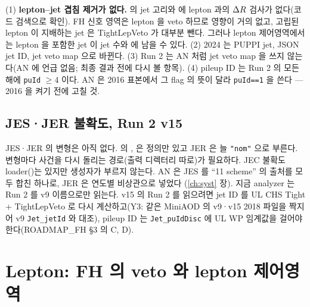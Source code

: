 \begin{andiff}
(1) \textbf{lepton–jet 겹침 제거가 없다.}  의 jet 고리와  에 lepton 과의 $\Delta R$ 검사가 없다(코드 검색으로
확인). FH 신호 영역은 lepton 을 veto 하므로 영향이 거의 없고, 고립된 lepton 이 지배하는 jet 은 TightLepVeto 가 대부분 뺀다. 그러나 lepton
제어영역에서는 lepton 을 포함한 jet 이 jet 수와 \HT{} 에 남을 수 있다\tagours. (2) 2024 는 PUPPI jet, JSON jet ID, jet veto map 으로
바뀐다\tagrunthree. (3) Run 2 는 AN 처럼 jet veto map 을 쓰지 않는다(AN 에 언급 없음; 최종 결과 전에 다시 볼 항목).
(4) pileup ID 는 Run 2 의 모든 해에 \texttt{puId} $\geq 4$ 이다. AN 은 2016 표본에서 그 flag 의 뜻이 달라 \texttt{puId==1} 을 쓴다
 --- 2016 을 켜기 전에 고칠 것.
\end{andiff}

\subsection{JES·JER 불확도, Run 2 v15}\label{sec:objects-jets-syst}

JES·JER 의 변형은 아직 없다.  의 ,  은 정의만 있고 JER 은 늘 \texttt{"nom"} 으로 부른다. 변형마다 사건을 다시
돌리는 경로(출력 디렉터리 따로)가 필요하다\tagplan. JEC 불확도 loader()는 있지만 생성자가
부르지 않는다. AN 은 JES 를 ``11 scheme'' 의 출처를 모두 합친 하나로, JER 은 연도별 비상관으로 넣었다
(\ref{ch:syst} 장). 지금 analyzer 는 Run 2 를 v9 이름으로만 읽는다. v15 의 Run 2 를 읽으려면 jet ID 를 UL CHS
Tight + TightLepVeto 로 다시 계산하고(Y3: 같은 MiniAOD 의 v9·v15 2018 파일을 짝지어 v9 \texttt{Jet\_jetId} 와 대조), pileup ID 는
\texttt{Jet\_puIdDisc} 에 UL WP 임계값을 걸어야 한다(ROADMAP\_FH §3 의 C, D)\tagplan.

\section{Lepton: FH 의 veto 와 lepton 제어영역}\label{sec:objects-leptons}

